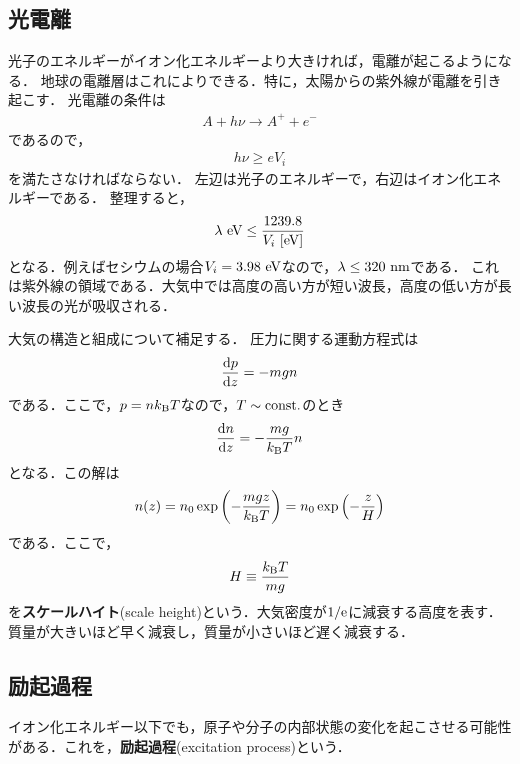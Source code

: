 \documentclass{report}
\begin{document}
    \subsection{光電離}
      光子のエネルギーがイオン化エネルギーより大きければ，電離が起こるようになる．
      地球の電離層はこれによりできる．特に，太陽からの紫外線が電離を引き起こす．
      光電離の条件は
      \begin{align}
        A + h\nu \rightarrow A^+ + e^-
      \end{align}
      であるので，
      \begin{align}
        h\nu \geq e V_i
      \end{align}
      を満たさなければならない．
      左辺は光子のエネルギーで，右辺はイオン化エネルギーである．
      整理すると，
      \begin{align}
        \lambda\ \mathrm{eV} \leq \frac{1239.8}{V_i\ [\mathrm{eV}]}
      \end{align}
      となる．例えばセシウムの場合$V_i = 3.98\ \mathrm{eV}$なので，$\lambda \leq 320\ \mathrm{nm}$である．
      これは紫外線の領域である．大気中では高度の高い方が短い波長，高度の低い方が長い波長の光が吸収される．
      \par
      大気の構造と組成について補足する．
      圧力に関する運動方程式は
      \begin{align}
        \dv{p}{z} = -mgn
      \end{align}
      である．ここで，$p=nk_{\mathrm{B}} T$なので，$T \sim \mathrm{const.}$のとき
      \begin{align}
        \dv{n}{z} = - \frac{mg}{k_{\mathrm{B}} T}n
      \end{align}
      となる．この解は
      \begin{align}
        n(z) = n_0 \exp\qty(-\frac{mgz}{k_{\mathrm{B}} T}) = n_0 \exp\qty(-\frac{z}{H})
      \end{align}
      である．ここで，
      \begin{align}
        H \equiv \frac{k_{\mathrm{B}} T}{mg}
      \end{align}
      を\textbf{スケールハイト}(scale height)という．大気密度が$1/\mathrm{e}$に減衰する高度を表す．
      質量が大きいほど早く減衰し，質量が小さいほど遅く減衰する．

    \subsection{励起過程}
      イオン化エネルギー以下でも，原子や分子の内部状態の変化を起こさせる可能性がある．これを，\textbf{励起過程}(excitation process)という．
\end{document}
